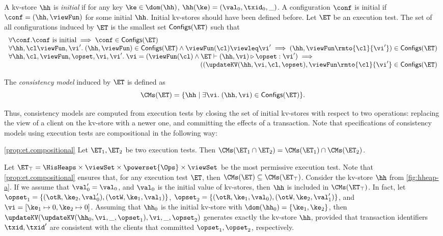 \begin{definition}
\label{def:cm}
A kv-store $\hh$ is \emph{initial} if for any key $\ke \in \dom(\hh)$, 
$\hh(\ke) = (\val_0, \txid_0, \_)$. A configuration $\conf$ is 
initial  if $\conf = (\hh, \viewFun)$ for some initial $\hh$.
\ac{Initial kv-stores should have been defined before.}
Let $\ET$ be an execution test. The set of all configurations 
induced by $\ET$ is the smallest set $\mathsf{Configs}(\ET)$ 
such that 
\[
\begin{array}{l}
\forall \conf. \conf \text{ is initial} \implies \conf \in \mathsf{Configs}(\ET)\\
\forall \hh, \cl \viewFun,\vi'.\; (\hh, \viewFun) \in \mathsf{Configs}(\ET) \wedge \viewFun(\cl) \viewleq \vi' \implies (\hh, \viewFun\rmto{\cl}{\vi'}) \in \mathsf{Configs}(\ET)\\
\forall \hh, \cl, \viewFun, \opset, \vi, \vi'.\; \vi = (\viewFun(\cl) \wedge \ET \vdash (\hh, \vi) \triangleright \opset : \vi') \implies {}\\
\hfill
((\updateKV(\hh, \vi, \cl, \opset), \viewFun\rmto{\cl}{\vi'} \in \mathsf{Configs}(\ET) 
\end{array}
\]

The \emph{consistency model} induced by $\ET$ is defined as 
\[
\CMs(\ET) = \{ \hh \mid \exists \vi.\; (\hh, \vi) \in \mathsf{Configs}(\ET) \}.
\]
\end{definition}

Thus, consistency models are computed from execution tests by closing the set of initial kv-stores with 
respect to two operations: replacing the view of a client on the kv-store with a newer one, and committing 
the effects of a transaction. Note that specifications of consistency models using execution tests 
are compositional in the following way: 

\begin{proposition}
\cref{prop:et.compositional}
Let $\ET_1, \ET_2$ be two execution tests. Then $\CMs(\ET_1 \cap \ET_2) = \CMs(\ET_1) \cap \CMs(\ET_2)$.
\end{proposition}

\begin{example}
Let $\ET_{\top} = \HisHeaps \times \viewSet \times \powerset{\Ops} \times \viewSet$ 
be the most permissive execution test. Note that \cref{prop:et.compositional} ensures 
that, for any execution test $\ET$, then $\CMs(\ET) \subseteq \CMs(\ET_{\top})$. 
Consider the kv-store $\hh$ from \cref{fig:hheap-a}. 
If we assume that $\val'_0 = \val_0$, and $\val_0$ is the initial value of kv-stores, 
then $\hh$ is included in $\CMs(\ET_{\top})$. 
In fact, let $\opset_1 = \{(\otR, \ke_2, \val'_0), (\otW, \ke_1, \val_1)\}$, 
$\opset_2 = \{(\otR, \ke_1, \val_0), (\otW, \ke_2, \val'_1)\}$, and 
$\vi = [\ke_1 \mapsto 0, \ke_2 \mapsto 0]$. Assuming that 
$\hh_0$ is the initial kv-store with $\dom(\hh_0) = \{ \ke_1, \ke_2\}$, 
then $\updateKV(\updateKV(\hh_0, \vi, \_, \opset_1), \vi, \_, \opset_2)$ 
generates exactly the kv-store $\hh$, provided that transaction identifiers 
$\txid, \txid'$ are consistent with the clients that committed $\opset_1, \opset_2$, 
respectively.
\end{example}

